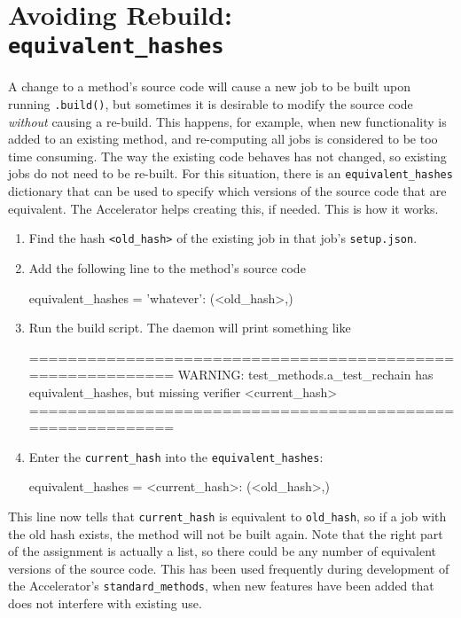 \section{Avoiding Rebuild: \texttt{equivalent\_hashes}}
\label{sec:equivalent_hashes}

A change to a method's source code will cause a new job to be built
upon running \texttt{.build()}, but sometimes it is
desirable to modify the source code \textsl{without} causing a
re-build.  This happens, for example, when new functionality is added
to an existing method, and re-computing all jobs is considered to be
too time consuming.  The way the existing code behaves has not
changed, so existing jobs do not need to be re-built.  For this
situation, there is an \texttt{equivalent\_hashes} dictionary that can
be used to specify which versions of the source code that are
equivalent.  The Accelerator helps creating this, if needed.  This is
how it works.
\begin{enumerate}
\item Find the hash \texttt{<old\_hash>} of the existing job in that
  job's \texttt{setup.json}.
\item Add the following line to the method's source code
\begin{python}
equivalent_hashes = {'whatever': (<old_hash>,)}
\end{python}
\item Run the build script.  The daemon will print something like
\begin{shell}
===========================================================
WARNING: test_methods.a_test_rechain has equivalent_hashes,
but missing verifier <current_hash>
===========================================================
\end{shell}
\item Enter the \texttt{current\_hash} into the
  \texttt{equivalent\_hashes}:
\begin{python}
equivalent_hashes = {<current_hash>: (<old_hash>,)}
\end{python}
\end{enumerate}
This line now tells that \texttt{current\_hash} is equivalent to
\texttt{old\_hash}, so if a job with the old hash exists, the method
will not be built again.  Note that the right part of the assignment
is actually a list, so there could be any number of equivalent
versions of the source code.  This has been used frequently during
development of the Accelerator's \texttt{standard\_methods}, when new
features have been added that does not interfere with existing use.



